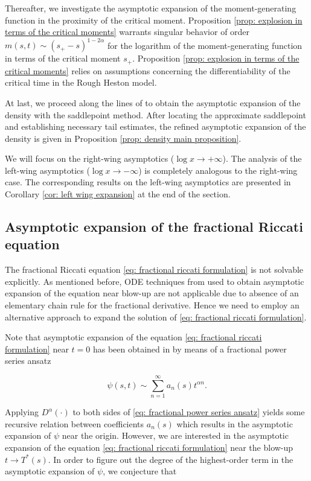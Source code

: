 \documentclass[12pt,twoside]{article}
\theoremstyle{plain}
\theoremstyle{plain}
\theoremstyle{definition}
\theoremstyle{remark}
\numberwithin{equation}{section}
\begin{document}
Thereafter, we investigate the asymptotic expansion of the moment-generating function in the proximity of the critical moment. Proposition \ref{prop: explosion in terms of the critical moments} warrants singular behavior of order $m(s, t) \sim (s_+ - s)^{1-2\alpha}$ for the logarithm of the moment-generating function in terms of the critical moment $s_+$. Proposition \ref{prop: explosion in terms of the critical moments} relies on assumptions concerning the differentiability of the critical time in the Rough Heston model.

At last, we proceed along the lines of \cite{FGGS10} to obtain the asymptotic expansion of the density with the saddlepoint method. After locating the approximate saddlepoint and establishing necessary tail estimates, the refined asymptotic expansion of the density is given in Proposition \ref{prop: density main proposition}.

We will focus on the right-wing asymptotics ($\log x\rightarrow +\infty$). The analysis of the left-wing asymptotics ($\log x \rightarrow -\infty$) is completely analogous to the right-wing case. The corresponding results on the left-wing asymptotics are presented in Corollary \ref{cor: left wing expansion} at the end of the section.

\subsection{Asymptotic expansion of the fractional Riccati equation}
\label{sec: blow up behavior of fractional riccati equation}

The fractional Riccati equation \eqref{eq: fractional riccati formulation} is not solvable explicitly. As mentioned before, ODE techniques from \cite{FGGS10} used to obtain asymptotic expansion of the equation near blow-up are not applicable due to absence of an elementary chain rule for the fractional derivative. Hence we need to employ an alternative approach to expand the solution of \eqref{eq: fractional riccati formulation}.

Note that asymptotic expansion of the equation \eqref{eq: fractional riccati formulation} near $t=0$ has been obtained in \cite{GGP18} by means of a fractional power series ansatz

\begin{equation}
\label{eq: fractional power series ansatz}
\psi(s, t) \sim \sum_{n=1}^{\infty} a_{n}(s) t^{\alpha n}.
\end{equation}

Applying $D^\alpha(\cdot)$ to both sides of \eqref{eq: fractional power series ansatz} yields some recursive relation between coefficients $a_n(s)$ which results in the asymptotic expansion of $\psi$ near the origin. However, we are interested in the asymptotic expansion of the equation \eqref{eq: fractional riccati formulation} near the blow-up $t \rightarrow T^*(s)$. In order to figure out the degree of the highest-order term in the asymptotic expansion of $\psi$, we conjecture that
\end{document}

